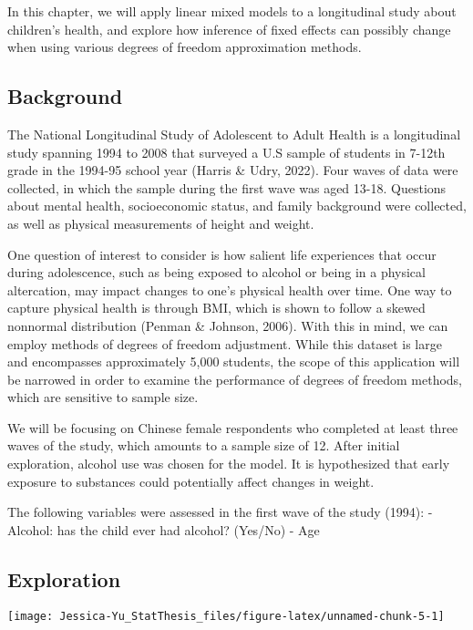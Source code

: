 \documentclass[12pt, twoside]{amherstthesis}
\begin{document}
In this chapter, we will apply linear mixed models to a longitudinal study about children's health, and explore how inference of fixed effects can possibly change when using various degrees of freedom approximation methods.

\hypertarget{background}{%
\subsection{Background}\label{background}}

The National Longitudinal Study of Adolescent to Adult Health is a longitudinal study spanning 1994 to 2008 that surveyed a U.S sample of students in 7-12th grade in the 1994-95 school year (Harris \& Udry, 2022). Four waves of data were collected, in which the sample during the first wave was aged 13-18. Questions about mental health, socioeconomic status, and family background were collected, as well as physical measurements of height and weight.

One question of interest to consider is how salient life experiences that occur during adolescence, such as being exposed to alcohol or being in a physical altercation, may impact changes to one's physical health over time. One way to capture physical health is through BMI, which is shown to follow a skewed nonnormal distribution (Penman \& Johnson, 2006). With this in mind, we can employ methods of degrees of freedom adjustment. While this dataset is large and encompasses approximately 5,000 students, the scope of this application will be narrowed in order to examine the performance of degrees of freedom methods, which are sensitive to sample size.

We will be focusing on Chinese female respondents who completed at least three waves of the study, which amounts to a sample size of 12. After initial exploration, alcohol use was chosen for the model. It is hypothesized that early exposure to substances could potentially affect changes in weight.

The following variables were assessed in the first wave of the study (1994):
- Alcohol: has the child ever had alcohol? (Yes/No)
- Age

\hypertarget{exploration}{%
\subsection{Exploration}\label{exploration}}
\begin{center}\texttt{[image: Jessica-Yu\_StatThesis\_files/figure-latex/unnamed-chunk-5-1]} \end{center}
\end{document}

